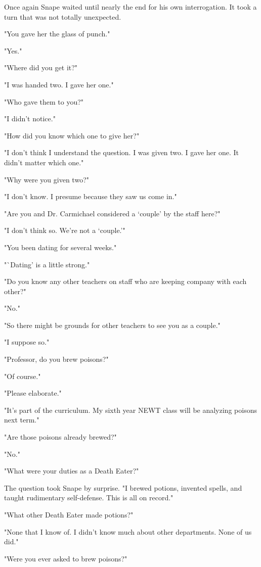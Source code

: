\documentclass[a4paper,11pt]{article}
\begin{document}
Once again Snape waited until nearly the end for his own interrogation. It took a turn that was not totally unexpected.

"You gave her the glass of punch."

"Yes."

"Where did you get it?"

"I was handed two. I gave her one."

"Who gave them to you?"

"I didn't notice."

"How did you know which one to give her?"

"I don't think I understand the question. I was given two. I gave her one. It didn't matter which one."

"Why were you given two?"

"I don't know. I presume because they saw us come in."

"Are you and Dr. Carmichael considered a `couple' by the staff here?"

"I don't think so. We're not a `couple.'"

"You been dating for several weeks."

"`Dating' is a little strong."

"Do you know any other teachers on staff who are keeping company with each other?"

"No."

"So there might be grounds for other teachers to see you as a couple."

"I suppose so."

"Professor, do you brew poisons?"

"Of course."

"Please elaborate."

"It's part of the curriculum. My sixth year NEWT class will be analyzing poisons next term."

"Are those poisons already brewed?"

"No."

"What were your duties as a Death Eater?"

The question took Snape by surprise. "I brewed potions, invented spells, and taught rudimentary self-defense. This is all on record."

"What other Death Eater made potions?"

"None that I know of. I didn't know much about other departments. None of us did."

"Were you ever asked to brew poisons?"
\end{document}
